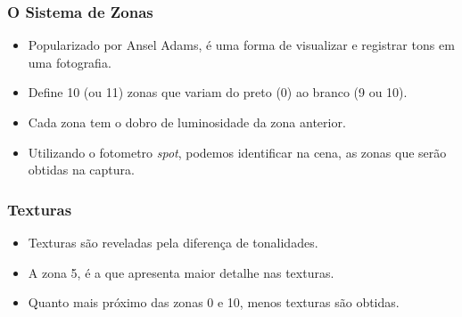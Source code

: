 \begin{frame}
    \frametitle{O Sistema de Zonas}
    \begin{itemize}
      \item Popularizado por Ansel Adams, é uma forma de visualizar e registrar
      tons em uma fotografia.
      \item Define 10 (ou 11) zonas que variam do preto (0) ao branco (9 ou 10).
      \item Cada zona tem o dobro de luminosidade da zona anterior.
      \item Utilizando o fotometro \textit{spot}, podemos identificar na cena, as
      zonas que serão obtidas na captura.
    \end{itemize}
\end{frame}



\begin{frame}
    \frametitle{Texturas}
    \begin{itemize}
      \item Texturas são reveladas pela diferença de tonalidades.
      \item A zona 5, é a que apresenta maior detalhe nas texturas.
      \item Quanto mais próximo das zonas 0 e 10, menos texturas são obtidas.
    \end{itemize}
\end{frame}

